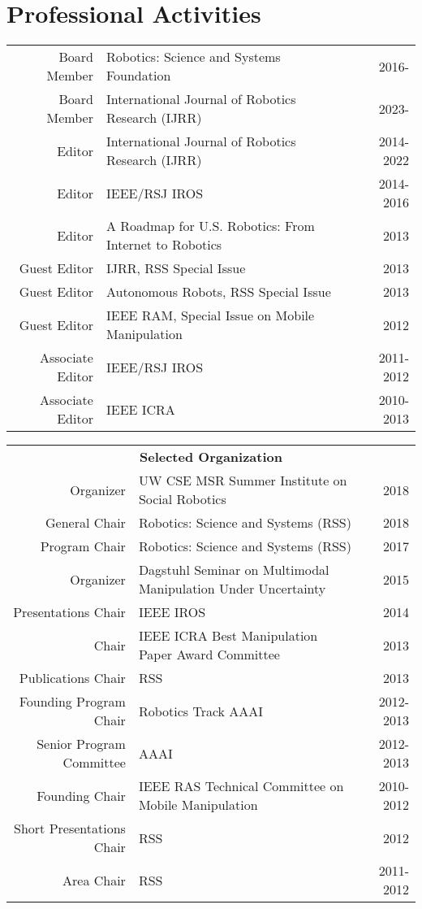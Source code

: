 
\section{Professional Activities}
\begin{tabularx}{\linewidth}{rXr}
Board Member & Robotics: Science and Systems Foundation & 2016-\phantom{2025}\\
Board Member & International Journal of Robotics Research (IJRR) & 2023-\phantom{2025}\\
Editor & International Journal of Robotics Research (IJRR) & 2014-2022\\
Editor & IEEE/RSJ IROS &  2014-2016\\
Editor & A Roadmap for U.S. Robotics: From Internet to Robotics & 2013\\
Guest Editor & IJRR, RSS Special Issue & 2013\\ 
Guest Editor & Autonomous Robots, RSS Special Issue & 2013\\ 
Guest Editor & IEEE RAM, Special Issue on Mobile Manipulation & 2012\\
Associate Editor & IEEE/RSJ IROS & 2011-2012\\
Associate Editor & IEEE ICRA & 2010-2013\\
\end{tabularx}

\begin{tabularx}{\linewidth}{rXr}
\multicolumn{3}{c}{\textbf{Selected Organization}}\\
Organizer & UW CSE MSR Summer Institute on Social Robotics & 2018\\
General Chair & Robotics: Science and Systems (RSS) & 2018\\
Program Chair & Robotics: Science and Systems (RSS) & 2017\\
Organizer & Dagstuhl Seminar on Multimodal Manipulation Under Uncertainty & 2015 \\
Presentations Chair & IEEE IROS & 2014\\ 
Chair & IEEE ICRA Best Manipulation Paper Award Committee & 2013\\
Publications Chair & RSS & 2013\\
Founding Program Chair & Robotics Track AAAI & 2012-2013 \\
Senior Program Committee & AAAI & 2012-2013 \\
Founding Chair & IEEE RAS Technical Committee on Mobile 
Manipulation & 2010-2012\\
Short Presentations Chair & RSS & 2012\\
Area Chair & RSS & 2011-2012\\
\end{tabularx}


